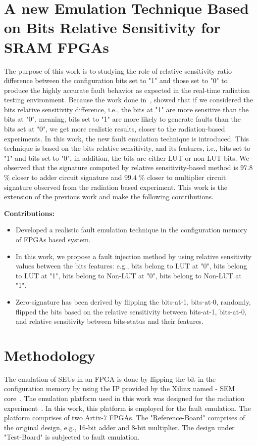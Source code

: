 \section{A new Emulation Technique Based on Bits Relative Sensitivity
for SRAM FPGAs}
\label{intro}

The purpose of this work is to  studying the role of relative sensitivity ratio difference between the configuration bits set to "1" and those set to "0" to produce the highly accurate fault behavior as expected in the real-time radiation testing environment. Because the work  done in~\citep{souari2016towards}, showed that if we considered the bits relative sensitivity difference, i.e., the bits at "1" are more sensitive than the bits at "0", meaning, bits set to "1" are more likely to generate faults than the bits set at "0", we get more realistic results, closer to the radiation-based experiments. 
In this work, the new fault emulation technique is introduced. This technique is based on the bits relative sensitivity, and its features, i.e., bits set to "1" and bits set to "0", in addition, the bits are either LUT or non LUT bits.  We observed that the signature computed by relative sensitivity-based method is $97.8$\% closer to adder circuit signature and $99.4$ \% closer to multiplier circuit signature observed from the radiation based experiment.
This work is the extension of the previous work and make the following contributions. 

\textbf{Contributions:} 
\begin{itemize}

\item{Developed a realistic fault emulation technique in the configuration memory
of FPGAs based system}.
\item{In this work, we propose a fault injection method by using relative sensitivity values between the bits features: e.g., bits belong to LUT at "0", bits belong to LUT at "1", bits belong to Non-LUT at "0", bits belong to Non-LUT at "1"}.
\item{Zero-signature has been derived by flipping the bits-at-1, bits-at-0, randomly, flipped the bits based on the relative sensitivity between bits-at-1, bits-at-0, and relative sensitivity between bits-status and their features}.
\end{itemize}


\section{Methodology}
\label{Methodology}
The emulation of SEUs in an FPGA is done by flipping the bit in the configuration memory by using the IP provided by the Xilinx named - SEM core~\citep{xilinx}. The emulation platform used in this work was designed for the radiation experiment~\citep{hobeika2014multi}. In this work, this platform is employed for the fault emulation. The platform comprises of two Artix-7 FPGAs. The "Reference-Board" comprises of the original design, e.g., 16-bit adder and 8-bit multiplier. The design under "Test-Board" is subjected to fault emulation.  

